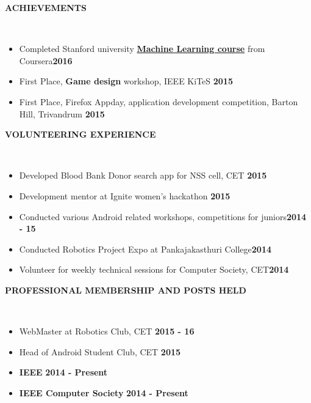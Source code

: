 \documentclass[a4paper,10pt]{article}
\newcommand{\lsep}{-0.5cm}
\newcommand{\resheading}[1]{{\small \colorbox{mygrey}{\begin{minipage}{0.975\textwidth}{\textbf{\uppercase{#1} \vphantom{p\^{E}}}}\end{minipage}}}}
\newcommand{\when}[1]{\hfill \textbf{#1}}
\newenvironment{noSepItemize}
{ \begin{itemize}
    \setlength{\itemsep}{1pt}
    \setlength{\parskip}{0pt}
    \setlength{\parsep}{0pt}     }
{ \end{itemize}                  }
\begin{document}
\resheading{\textbf{Achievements} }\\[\lsep]
\begin{noSepItemize}
	\item \noindent Completed Stanford university \textbf{\href{https://www.coursera.org/account/accomplishments/records/EJQWCKEBUSBD}{Machine Learning course}} from Coursera\when{2016}
	\item \noindent First Place, \textbf{Game design} workshop, IEEE KiTeS \when{2015}
	\item \noindent First Place, Firefox Appday, application development competition, Barton Hill, Trivandrum \when{2015}
\end{noSepItemize}

\resheading{\textbf{Volunteering Experience} }\\[\lsep]
\begin{noSepItemize}
	\item \noindent Developed Blood Bank Donor search app for NSS cell, CET \when{2015}
	\item \noindent Development mentor at Ignite women's hackathon \when{2015}
	\item \noindent Conducted various Android related workshops, competitions for juniors\when{2014 - 15}
	\item \noindent Conducted Robotics Project Expo at Pankajakasthuri College\when{2014}
	\item \noindent Volunteer for weekly technical sessions for Computer Society, CET\when{2014}
\end{noSepItemize}

\resheading{\textbf{Professional Membership and Posts Held} }\\[\lsep]
\begin{noSepItemize}
	\item \noindent WebMaster at Robotics Club, CET \when{2015 - 16}
	\item \noindent Head of Android Student Club, CET \when{2015}
	\item \noindent \textbf{IEEE} \when{2014 - Present}
	\item \noindent \textbf{IEEE Computer Society} \when{2014 - Present}
\end{noSepItemize}
\end{document}
